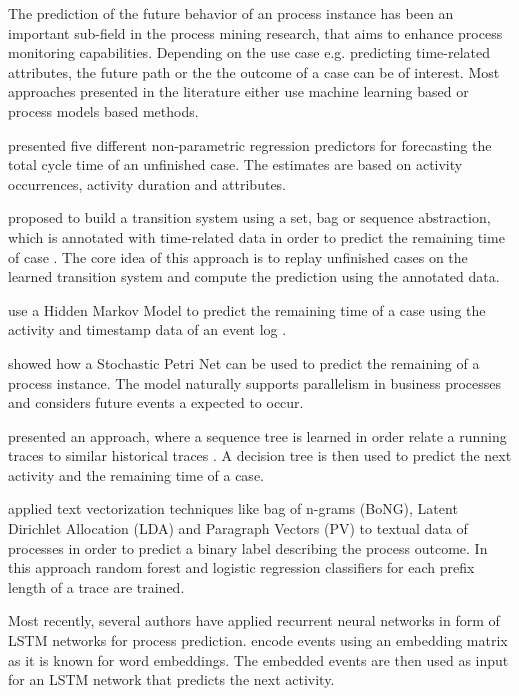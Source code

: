 
The prediction of the future behavior of an process instance has been an important sub-field in the process mining research, that aims to enhance process monitoring capabilities.
Depending on the use case e.g. predicting time-related attributes, the future path or the the outcome of a case can be of interest.
Most approaches presented in the literature either use machine learning based or process models based methods.

 presented five different non-parametric regression predictors for forecasting the total cycle time of an unfinished case\cite{DBLP:conf/otm/DongenCA08}.
The estimates are based on activity occurrences, activity duration and attributes.

 proposed to build a transition system using a set, bag or sequence abstraction, which is annotated with time-related data in order to predict the remaining time of case \cite{DBLP:journals/is/AalstSS11}.
The core idea of this approach is to replay unfinished cases on the learned transition system and compute the prediction using the annotated data.

\citeauthor{DBLP:conf/colcom/PandeyNC11} use a Hidden Markov Model to predict the remaining time of a case using the activity and timestamp data of an event log \cite{DBLP:conf/colcom/PandeyNC11}.

\citeauthor{DBLP:conf/icsoc/Rogge-SoltiW13} showed how a Stochastic Petri Net can be used to predict the remaining of a process instance.
The model naturally supports parallelism in business processes and considers future events a expected to occur. 

\citeauthor{DBLP:conf/dis/CeciLFCM14} presented an approach, where a sequence tree is learned in order relate a running traces to similar historical traces \cite{DBLP:conf/dis/CeciLFCM14}.
A decision tree is then used to predict the next activity and the remaining time of a case.

\citeauthor{DBLP:conf/bpm/TeinemaaDMF16} applied text vectorization techniques like bag of n-grams (BoNG), Latent Dirichlet Allocation (LDA) and Paragraph Vectors (PV) to textual data of processes in order to predict a binary label describing the process outcome\cite{DBLP:conf/bpm/TeinemaaDMF16}.
In this approach random forest and logistic regression classifiers for each prefix length of a trace are trained.

Most recently, several authors have applied recurrent neural networks in form of LSTM networks for process prediction. \citeauthor{ DBLP:conf/bpm/EvermannRF16} encode events using an embedding matrix as it is known for word embeddings. The embedded events are then used as input for an LSTM network that predicts the next activity\cite{DBLP:conf/bpm/EvermannRF16}.

